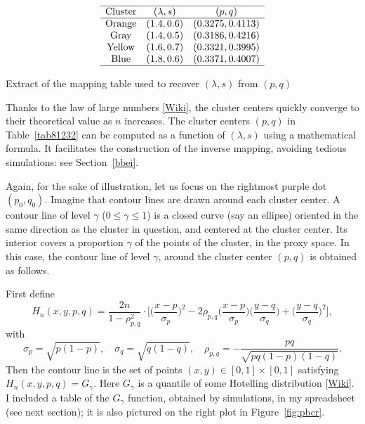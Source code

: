 \documentclass[10pt]{article}
\begin{document}
\begin{table}[H]
\[
\begin{array}{ccc}
\hline
 \mbox{Cluster} &  (\lambda,  s) & (p, q) \\
\hline
 \mbox{Orange} & (1.4, 0.6) & (0.3275,  0.4113)\\
\mbox{Gray} & (1.4, 0.5) & (0.3186, 0.4216) \\
\mbox{Yellow} & (1.6,  0.7) & (0.3321, 0.3995)\\
\mbox{Blue} & (1.8, 0.6)&  (0.3371,  0.4007)\\
\hline
\end{array}
\]
\caption{\label{tab81232}Extract of the mapping table used to recover $(\lambda,s)$ from $(p,q)$}
\end{table}


\noindent Thanks to the
\textcolor{index}{law of large numbers}
\href{https://en.wikipedia.org/wiki/Law_of_large_numbers}{[Wiki]}, the cluster centers quickly converge to their theoretical value as $n$ increases. The cluster
 centers $(p, q)$ in Table~\ref{tab81232} can be computed as a function
of $(\lambda, s)$ using a mathematical formula. It facilitates the construction of the inverse
mapping, avoiding tedious simulations: see Section~\ref{bbei}.
\quad \\

\nopagebreak

\noindent Again, for the sake of illustration, let us focus on the rightmost purple dot $(p_0,q_0)$. Imagine that contour lines are drawn around each cluster center. A \textcolor{index}{contour line} of level
$\gamma$ ($0\leq\gamma\leq 1$) is a closed curve (say an ellipse) oriented in the same direction as the cluster in question, and centered at the cluster center. Its interior covers a proportion $\gamma$ of the points of the cluster, in the proxy space. In this case, the contour line of level $\gamma$, around the
cluster center $(p,q)$ is obtained as follows.

\noindent First define
\begin{equation}
H_n(x,y,p,q)=\frac{2n}{1-\rho_{p,q}^2}\cdot
\Big[\Big( \frac{x-p}{\sigma_p}\Big)^2
-2\rho_{p,q}\Big(\frac{x-p}{\sigma_p}\Big)\Big(\frac{y-q}{\sigma_q}\Big)
+ \Big(\frac{y-q}{\sigma_q}\Big)^2\Big],\label{gauss2d}
\end{equation}
with
\begin{equation}
\sigma_p
=\sqrt{p(1-p)},
\quad \sigma_q=\sqrt{q(1-q)},
\quad \rho_{p,q}=-\frac{pq}{\sqrt{pq(1-p)(1-q)}}.
\end{equation}
Then the contour line is the set of points $(x,y)\in[0,1]\times[0,1]$ satisfying $H_n(x,y,p,q)=G_\gamma$. Here
$G_\gamma$ is a quantile of some \textcolor{index}{Hotelling distribution}
 [\href{https://bit.ly/3uQ4a3t}{Wiki}]. I included a table of the $G_\gamma$ function, obtained by simulations, in my spreadsheet (see next section); it is also
pictured on the right plot in Figure~\ref{fig:pbcr}.
\end{document}
